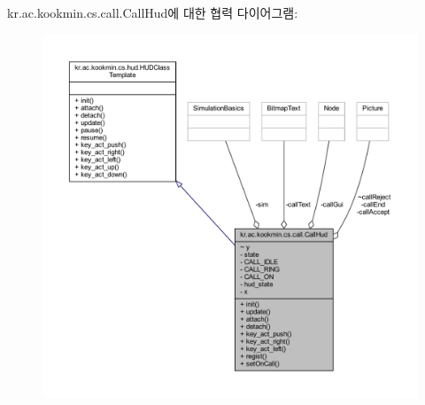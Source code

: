 kr.\+ac.\+kookmin.\+cs.\+call.\+Call\+Hud에 대한 협력 다이어그램\+:\nopagebreak
\begin{figure}[H]
\begin{center}
\leavevmode
\includegraphics[width=350pt]{classkr_1_1ac_1_1kookmin_1_1cs_1_1call_1_1_call_hud__coll__graph}
\end{center}
\end{figure}
